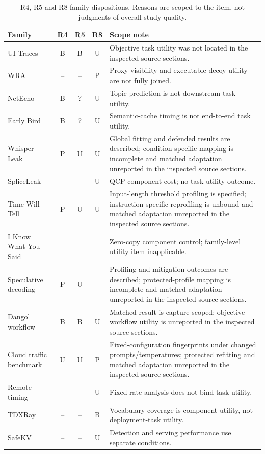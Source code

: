 \begin{table}[t]\centering\footnotesize
\caption{R4, R5 and R8 family dispositions. Reasons are scoped to the item, not judgments of overall study quality.}\label{tab:r8-family-reasons}
\begin{tabularx}{\textwidth}{@{}lcccX@{}}\toprule
Family & R4 & R5 & R8 & Scope note\\\midrule
UI Traces & B & B & U & Objective task utility was not located in the inspected source sections.\\
WRA & -- & -- & P & Proxy visibility and executable-decoy utility are not fully joined.\\
NetEcho & B & ? & U & Topic prediction is not downstream task utility.\\
Early Bird & B & ? & U & Semantic-cache timing is not end-to-end task utility.\\
Whisper Leak & P & U & U & Global fitting and defended results are described; condition-specific mapping is incomplete and matched adaptation unreported in the inspected source sections.\\
SpliceLeak & -- & -- & U & QCP component cost; no task-utility outcome.\\
Time Will Tell & P & U & U & Input-length threshold profiling is specified; instruction-specific reprofiling is unbound and matched adaptation unreported in the inspected source sections.\\
I Know What You Said & -- & -- & -- & Zero-copy component control; family-level utility item inapplicable.\\
Speculative decoding & P & U & -- & Profiling and mitigation outcomes are described; protected-profile mapping is incomplete and matched adaptation unreported in the inspected source sections.\\
Dangol workflow & B & B & U & Matched result is capture-scoped; objective workflow utility is unreported in the inspected source sections.\\
Cloud traffic benchmark & U & U & P & Fixed-configuration fingerprints under changed prompts/temperatures; protected refitting and matched adaptation unreported in the inspected source sections.\\
Remote timing & -- & -- & U & Fixed-rate analysis does not bind task utility.\\
TDXRay & -- & -- & B & Vocabulary coverage is component utility, not deployment-task utility.\\
SafeKV & -- & -- & U & Detection and serving performance use separate conditions.\\

\end{tabularx}
\end{table}
